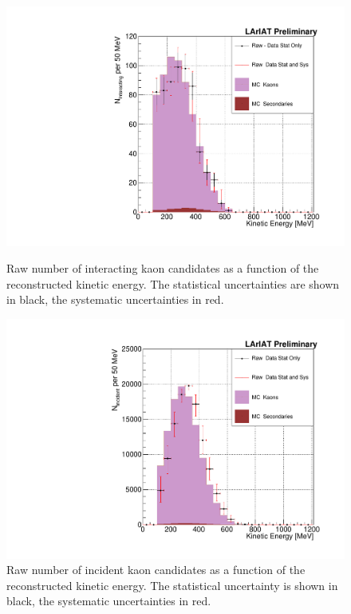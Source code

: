 \begin{figure}[]
\centering
\begin{minipage}[t]{0.45\textwidth}
\centering
\includegraphics[width=\textwidth]{Chapter-7/Images/Plots_MCData_Int_StatSystK.pdf}
\caption{Raw number of interacting kaon candidates as a function of the reconstructed kinetic energy. The statistical uncertainties are shown in black, the systematic uncertainties in red.}
\label{fig:InteractingRawK}
\end{minipage}\hfill
\begin{minipage}[t]{0.45\textwidth}
\centering
\includegraphics[width=\textwidth]{Chapter-7/Images/Plots_MCData_Inc_StatSystK.pdf}
\caption{Raw number of incident kaon candidates as a function of the reconstructed kinetic energy. The statistical uncertainty is shown in black, the systematic uncertainties in red.}
\label{fig:IncidentRawK}
\end{minipage}
\end{figure}



